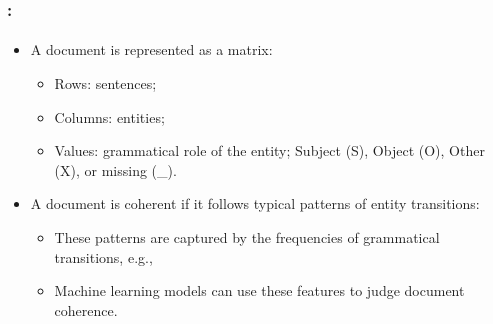 \documentclass[xcolor=table]{beamer}
\begin{document}
\begin{frame}
	\frametitle{\insertshortsubtitle: \insertsection}
	\framesubtitle{\insertsubsection}
	
	\begin{itemize}
		\item A document is represented as a matrix:
		\begin{itemize}
			\item Rows: sentences;
			\item Columns: entities;
			\item Values: grammatical role of the entity; Subject (S), Object (O), Other (X), or missing (\_).
		\end{itemize}
		\item A document is coherent if it follows typical patterns of entity transitions:
		\begin{itemize}
			\item These patterns are captured by the frequencies of grammatical transitions, e.g., 
			\item Machine learning models can use these features to judge document coherence.
		\end{itemize}
	\end{itemize}
	
	
\end{frame}
\end{document}
